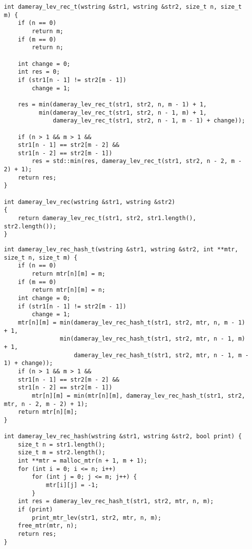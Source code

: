 \clearpage

\begin{lstlisting}[label=lst:dameray_lev_mtr,caption=Функция нахождения расстояния Дамерау-Левенштейна рекурсивно]
int dameray_lev_rec_t(wstring &str1, wstring &str2, size_t n, size_t m) {
	if (n == 0)
		return m;
	if (m == 0)
		return n;
	
	int change = 0;
	int res = 0;
	if (str1[n - 1] != str2[m - 1])
		change = 1;
	
	res = min(dameray_lev_rec_t(str1, str2, n, m - 1) + 1,
		  min(dameray_lev_rec_t(str1, str2, n - 1, m) + 1,
		      dameray_lev_rec_t(str1, str2, n - 1, m - 1) + change));
	
	if (n > 1 && m > 1 &&
	str1[n - 1] == str2[m - 2] &&
	str1[n - 2] == str2[m - 1])
		res = std::min(res, dameray_lev_rec_t(str1, str2, n - 2, m - 2) + 1);
	return res;
}

int dameray_lev_rec(wstring &str1, wstring &str2)
{
	return dameray_lev_rec_t(str1, str2, str1.length(), str2.length());
}
\end{lstlisting}

\clearpage

\begin{lstlisting}[label=lst:dameray_lev_rec_hash,caption=Функция нахождения расстояния Дамерау-Левенштейна рекурсивно c кешированием]
int dameray_lev_rec_hash_t(wstring &str1, wstring &str2, int **mtr, size_t n, size_t m) {
	if (n == 0)
		return mtr[n][m] = m;
	if (m == 0)
		return mtr[n][m] = n;
	int change = 0;
	if (str1[n - 1] != str2[m - 1])
		change = 1;
	mtr[n][m] = min(dameray_lev_rec_hash_t(str1, str2, mtr, n, m - 1) + 1,
				min(dameray_lev_rec_hash_t(str1, str2, mtr, n - 1, m) + 1,
					dameray_lev_rec_hash_t(str1, str2, mtr, n - 1, m - 1) + change));
	if (n > 1 && m > 1 &&
	str1[n - 1] == str2[m - 2] &&
	str1[n - 2] == str2[m - 1])
		mtr[n][m] = min(mtr[n][m], dameray_lev_rec_hash_t(str1, str2, mtr, n - 2, m - 2) + 1);
	return mtr[n][m];
}

int dameray_lev_rec_hash(wstring &str1, wstring &str2, bool print) {
	size_t n = str1.length();
	size_t m = str2.length();
	int **mtr = malloc_mtr(n + 1, m + 1);
	for (int i = 0; i <= n; i++)
		for (int j = 0; j <= m; j++) {
			mtr[i][j] = -1;
		}
	int res = dameray_lev_rec_hash_t(str1, str2, mtr, n, m);
	if (print)
		print_mtr_lev(str1, str2, mtr, n, m);
	free_mtr(mtr, n);
	return res;
}
\end{lstlisting}

\clearpage


